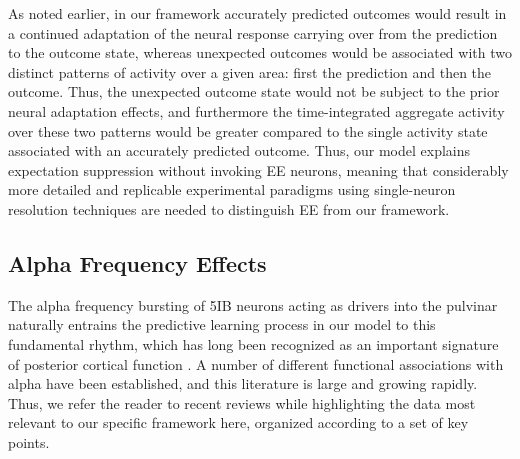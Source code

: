 \documentclass[11pt,twoside]{article}
\newif\myifpdf
\begin{document}
As noted earlier, in our framework accurately predicted outcomes would result in a continued adaptation of the neural response carrying over from the prediction to the outcome state, whereas unexpected outcomes would be associated with two distinct patterns of activity over a given area: first the prediction and then the outcome.  Thus, the unexpected outcome state would not be subject to the prior neural adaptation effects, and furthermore the time-integrated aggregate activity over these two patterns would be greater compared to the single activity state associated with an accurately predicted outcome.  Thus, our model explains expectation suppression without invoking EE neurons, meaning that considerably more detailed and replicable experimental paradigms using single-neuron resolution techniques are needed to distinguish EE from our framework.

\subsection{Alpha Frequency Effects}

The alpha frequency bursting of 5IB neurons acting as drivers into the pulvinar naturally entrains the predictive learning process in our model to this fundamental rhythm, which has long been recognized as an important signature of posterior cortical function \citep{Berger29,Walter53,NunnOsselton74,VarelaToroJohnEtAl81,VanRullenKoch03}.  A number of different functional associations with alpha have been established, and this literature is large and growing rapidly.  Thus, we refer the reader to recent reviews \citep{JensenBonnefondMarshallEtAl15,VanRullen16,ClaytonYeungKadosh18,FosterAwh19} while highlighting the data most relevant to our specific framework here, organized according to a set of key points.
\end{document}
